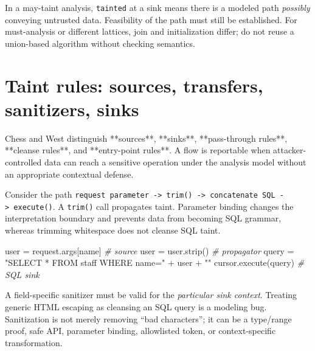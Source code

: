 \documentclass[
  letterpaper,
]{article}
\newenvironment{Shaded}{}{}
\newcommand{\CommentTok}[1]{\textcolor[rgb]{0.38,0.63,0.69}{\textit{#1}}}
\newcommand{\NormalTok}[1]{#1}
\newcommand{\OperatorTok}[1]{\textcolor[rgb]{0.40,0.40,0.40}{#1}}
\newcommand{\StringTok}[1]{\textcolor[rgb]{0.25,0.44,0.63}{#1}}
\begin{document}
In a may-taint analysis, \texttt{tainted} at a sink means there is a
modeled path \emph{possibly} conveying untrusted data. Feasibility of
the path must still be established. For must-analysis or different
lattices, join and initialization differ; do not reuse a union-based
algorithm without checking semantics.

\section{Taint rules: sources, transfers, sanitizers,
sinks}\label{taint-rules-sources-transfers-sanitizers-sinks}

\begin{sourceconcept}
Chess and West distinguish **sources**, **sinks**, **pass-through rules**, **cleanse rules**, and **entry-point rules**. A flow is reportable when attacker-controlled data can reach a sensitive operation under the analysis model without an appropriate contextual defense.
\end{sourceconcept}

Consider the path
\texttt{request\ parameter\ -\textgreater{}\ trim()\ -\textgreater{}\ concatenate\ SQL\ -\textgreater{}\ execute()}.
A \texttt{trim()} call propagates taint. Parameter binding changes the
interpretation boundary and prevents data from becoming SQL grammar,
whereas trimming whitespace does not cleanse SQL taint.

\begin{Shaded}
\begin{Highlighting}[]
\NormalTok{user }\OperatorTok{=}\NormalTok{ request.args[}\StringTok{\textquotesingle{}name\textquotesingle{}}\NormalTok{]   }\CommentTok{\# source}
\NormalTok{user }\OperatorTok{=}\NormalTok{ user.strip()           }\CommentTok{\# propagator}
\NormalTok{query }\OperatorTok{=} \StringTok{"SELECT * FROM staff WHERE name=\textquotesingle{}"} \OperatorTok{+}\NormalTok{ user }\OperatorTok{+} \StringTok{"\textquotesingle{}"}
\NormalTok{cursor.execute(query)         }\CommentTok{\# SQL sink}
\end{Highlighting}
\end{Shaded}

A field-specific sanitizer must be valid for the \emph{particular sink
context}. Treating generic HTML escaping as cleansing an SQL query is a
modeling bug. Sanitization is not merely removing ``bad characters''; it
can be a type/range proof, safe API, parameter binding, allowlisted
token, or context-specific transformation.
\end{document}
